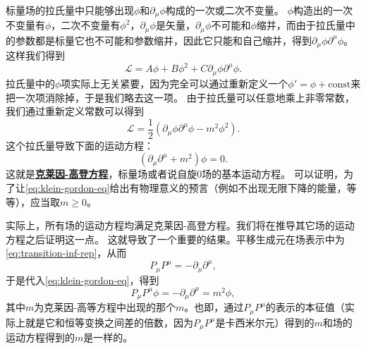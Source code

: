 \documentclass[hyperref, UTF8, a4paper]{ctexart}
\newcommand*{\const}{\mathrm{const}}
\renewcommand{\autoref}{\prettyref}
\newcommand{\concept}[1]{\underline{\textbf{#1}}}
\begin{document}
标量场的拉氏量中只能够出现$\phi$和$\partial_\mu \phi$构成的一次或二次不变量。
$\phi$构造出的一次不变量有$\phi$，二次不变量有$\phi^2$，$\partial_\mu \phi$是矢量，$\partial_\mu \phi$不可能和$\phi$缩并，而由于拉氏量中的参数都是标量它也不可能和参数缩并，因此它只能和自己缩并，得到$\partial_\mu \phi \partial^\mu \phi$。
这样我们得到
\[
    \mathcal{L} = A \phi + B \phi^2 + C \partial_\mu \phi \partial^\mu \phi.
\]
拉氏量中的$\phi$项实际上无关紧要，因为完全可以通过重新定义一个$\phi' = \phi + \const$来把一次项消除掉，于是我们略去这一项。
由于拉氏量可以任意地乘上非零常数，我们通过重新定义常数可以得到
\begin{equation}
    \mathcal{L} = \frac{1}{2} (\partial_\mu \phi \partial^\mu \phi - m^2 \phi^2).
    \label{eq:klein-gordon-lagrangian}
\end{equation}
这个拉氏量导致下面的运动方程：
\begin{equation}
    (\partial_\mu \partial^\mu + m^2) \phi = 0.
    \label{eq:klein-gordon-eq}
\end{equation}
这就是\concept{克莱因-高登方程}，标量场或者说自旋0场的基本运动方程。
可以证明，为了让\eqref{eq:klein-gordon-eq}给出有物理意义的预言（例如不出现无限下降的能量，等等），应当取$m \geq 0$。

实际上，所有场的运动方程均满足克莱因-高登方程。我们将在推导其它场的运动方程之后证明这一点。
这就导致了一个重要的结果。平移生成元在场表示中为\eqref{eq:transition-inf-rep}，从而
\[
    P_\mu P^\mu = - \partial_\mu \partial^\mu,
\]
于是代入\eqref{eq:klein-gordon-eq}，得到
\[
    P_\mu P^\mu \phi = - \partial_\mu \partial^\mu = m^2 \phi,
\]
其中$m$为克莱因-高等方程中出现的那个$m$。也即，通过$P_\mu P^\mu$的表示的本征值（实际上就是它和恒等变换之间差的倍数，因为$P_\mu P^\mu$是卡西米尔元）得到的$m$和场的运动方程得到的$m$是一样的。
\end{document}
